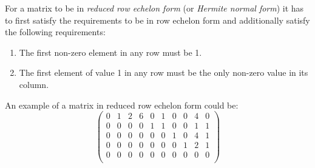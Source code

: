 \documentclass{article}
\begin{document}
For a matrix to be in \emph{reduced row echelon form} (or \emph{Hermite normal form}) it has to first satisfy the requirements to be in row echelon form and additionally satisfy the following requirements:

\begin{enumerate}
\item The first non-zero element in any row must be 1.
\item The first element of value 1 in any row must be the only non-zero value in its column.
\end{enumerate}
An example of a matrix in reduced row echelon form could be:
\begin{displaymath}
\left( \begin{array}{cccccccccc}
0 & 1 & 2 & 6 & 0 & 1 & 0 & 0 & 4 & 0\\
0 & 0 & 0 & 0 & 1 & 1 & 0 & 0 & 1 & 1\\
0 & 0 & 0 & 0 & 0 & 0 & 1 & 0 & 4 & 1\\
0 & 0 & 0 & 0 & 0 & 0 & 0 & 1 & 2 & 1\\
0 & 0 & 0 & 0 & 0 & 0 & 0 & 0 & 0 & 0\\
\end{array}
\right)
\end{displaymath}
\end{document}
